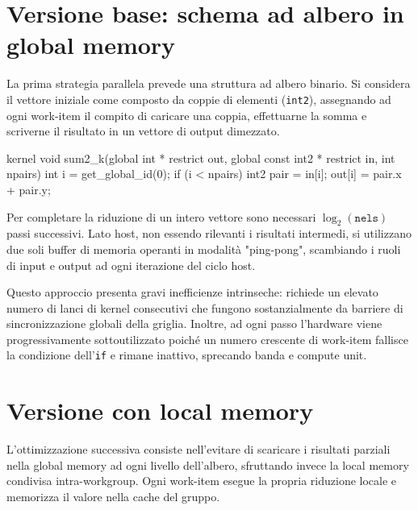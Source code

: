 \section{Versione base: schema ad albero in global memory}\label{sec:reduce_albero}

La prima strategia parallela prevede una struttura ad albero binario. Si considera il vettore iniziale come composto da coppie di elementi (\texttt{int2}), assegnando ad ogni work-item il compito di caricare una coppia, effettuarne la somma e scriverne il risultato in un vettore di output dimezzato.

\begin{code}[caption={Kernel di somma ad albero (passo singolo)}, label={code:sum2_k}]
kernel void sum2_k(global int * restrict out,
                   global const int2 * restrict in, int npairs)
{
    int i = get_global_id(0);
    if (i < npairs) {
        int2 pair = in[i];
        out[i] = pair.x + pair.y;
    }
}
\end{code}

Per completare la riduzione di un intero vettore sono necessari $\log_2(\texttt{nels})$ passi successivi. Lato host, non essendo rilevanti i risultati intermedi, si utilizzano due soli buffer di memoria operanti in modalità "ping-pong", scambiando i ruoli di input e output ad ogni iterazione del ciclo host.

Questo approccio presenta gravi inefficienze intrinseche: richiede un elevato numero di lanci di kernel consecutivi che fungono sostanzialmente da barriere di sincronizzazione globali della griglia. Inoltre, ad ogni passo l'hardware viene progressivamente sottoutilizzato poiché un numero crescente di work-item fallisce la condizione dell'\texttt{if} e rimane inattivo, sprecando banda e compute unit.

\section{Versione con local memory}\label{sec:reduce_lmem}

L'ottimizzazione successiva consiste nell'evitare di scaricare i risultati parziali nella global memory ad ogni livello dell'albero, sfruttando invece la local memory condivisa intra-workgroup. Ogni work-item esegue la propria riduzione locale e memorizza il valore nella cache del gruppo.

